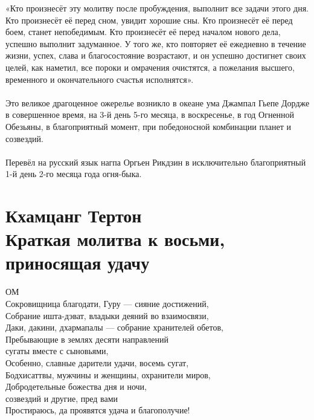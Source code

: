 «Кто произнесёт эту молитву после пробуждения, выполнит все задачи этого дня.
Кто произнесёт её перед сном, увидит хорошие сны.
Кто произнесёт её перед боем, станет непобедимым.
Кто произнесёт её перед началом нового дела, успешно выполнит задуманное.
У того же, кто повторяет её ежедневно в течение жизни, успех,
слава и благосостояние возрастают, и он успешно достигнет
своих целей, как наметил, все пороки и омрачения очистятся,
а пожелания высшего, временного и окончательного счастья исполнятся».\\
\\
Это великое драгоценное ожерелье возникло в океане ума
Джампал Гьепе Дордже в совершенное время, на 3-й день
5-го месяца, в воскресенье, в год Огненной Обезьяны,
в благоприятный момент, при победоносной комбинации планет и созвездий.\\
\\
Перевёл на русский язык нагпа Оргьен Рикдзин
в исключительно благоприятный 1-й день 2-го месяца года огня-быка.
\normalsize
\newpage
\section{Кхамцанг Тертон\\Краткая молитва к восьми, \\приносящая удачу}
ОМ\\
Сокровищница благодати, Гуру — сияние достижений,\\
Собрание ишта-дэват, владыки деяний во взаимосвязи,\\
Даки, дакини, дхармапалы — собрание хранителей обетов,\\
Пребывающие в землях десяти направлений \\ \indent сугаты вместе с сыновьями,\\
Особенно, славные дарители удачи, восемь сугат,\\
Бодхисаттвы, мужчины и женщины, охранители миров,\\
Добродетельные божества дня и ночи, \\ \indent созвездий и другие, пред вами\\
Простираюсь, да проявятся удача и благополучие!\\

